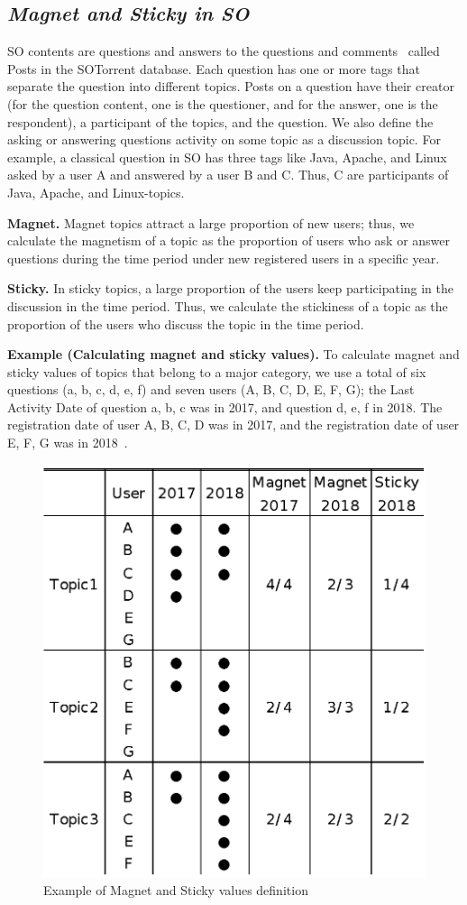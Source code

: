 \documentclass[english,preprint,JIP,technote]{ipsj}
\begin{document}
\subsection*{\textit{\textbf{Magnet and Sticky in SO}}}

SO contents are questions and answers to the questions and comments~\cite{liu2018mining} called Posts in the  SOTorrent\cite{baltes2018sotorrent} database. Each question has one or more tags that separate the question into different topics. Posts on a question have their creator (for the question content, one is the questioner, and for the answer, one is the respondent), a participant of the topics, and the question. We also define the asking or answering questions activity on some topic as a discussion topic. For example, a classical question in SO has three tags like Java, Apache, and Linux asked by a user A and answered by a user B and C. Thus, C are participants of Java, Apache, and Linux-topics.

\noindent
\textbf{Magnet.} Magnet topics attract a large proportion of new users; thus, we calculate the magnetism of a topic as the proportion of users who ask or answer questions during the time period under new registered users in a specific year.

\noindent
\textbf{Sticky.} In sticky topics, a large proportion of the users keep participating in the discussion in the time period. Thus, we calculate the stickiness of a topic as the proportion of the users who discuss the topic in the time period.

\noindent
\textbf{Example (Calculating magnet and sticky values).}
To calculate magnet and sticky values of topics that belong to a major category, we use a total of six questions (a, b, c, d, e, f) and seven users (A, B, C, D, E, F, G); the Last Activity Date of question a, b, c was in 2017, and question d, e, f in 2018. The registration date of user A, B, C, D was in 2017, and the registration date of user E, F, G was in 2018~\cite{yamashita2016magnet}.

\begin{figure}[t]
 \centering
 \includegraphics[width=.75\hsize]{img/explainofMS.eps}  
 \caption{Example of Magnet and Sticky values definition} 
 \label{fig:example2} 
\end{figure}
\end{document}
